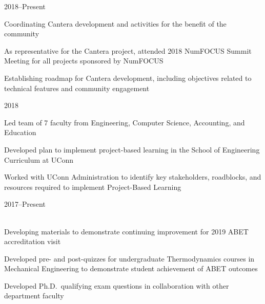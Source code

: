\begin{lonelist}
\item[]  \hfill 2018--Present\\

\begin{innerlist}
    \item Coordinating Cantera development and activities for the benefit of the community
    \item As representative for the Cantera project, attended 2018 NumFOCUS Summit Meeting for all projects sponsored by NumFOCUS
    \item Establishing roadmap for Cantera development, including objectives related to technical features and community engagement
\end{innerlist}

\item[]  \hfill 2018\\

\begin{innerlist}
    \item Led team of 7 faculty from Engineering, Computer Science, Accounting, and Education
    \item Developed plan to implement project-based learning in the School of Engineering Curriculum at UConn
    \item Worked with UConn Administration to identify key stakeholders, roadblocks, and resources required to implement Project-Based Learning
\end{innerlist}

\item[]  \hfill 2017--Present\\
\\

\begin{innerlist}
    \item Developing materials to demonstrate continuing improvement for 2019 ABET accreditation visit
    \item Developed pre- and post-quizzes for undergraduate Thermodynamics courses in Mechanical Engineering to demonstrate student achievement of ABET outcomes
    \item Developed Ph.D.\ qualifying exam questions in collaboration with other department faculty
\end{innerlist}


\end{lonelist}
